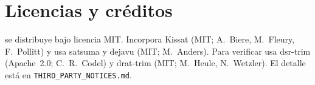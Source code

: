 \documentclass[11pt,a4paper]{article}
\begin{document}
\section{Licencias y créditos}

\labesat{} se distribuye bajo licencia MIT. Incorpora Kissat (MIT; A.~Biere,
M.~Fleury, F.~Pollitt) y usa satsuma y dejavu (MIT; M.~Anders). Para verificar
usa dsr-trim (Apache~2.0; C.~R.~Codel) y drat-trim (MIT; M.~Heule,
N.~Wetzler). El detalle está en \texttt{THIRD\_PARTY\_NOTICES.md}.
\end{document}
